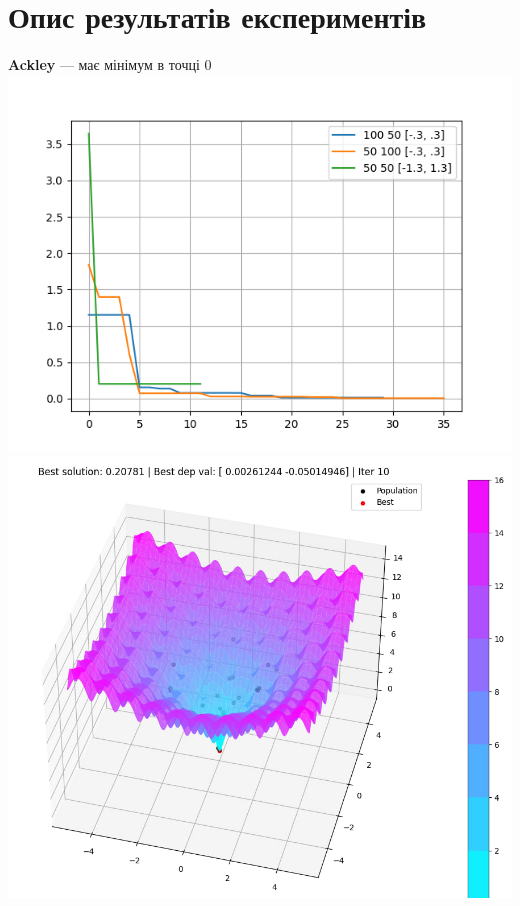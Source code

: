 \documentclass{article}
\begin{document}
    \section{Опис результатів експериментів}
        \textbf{Ackley} --- має мінімум в точці 0
            \newline
            \includegraphics[scale=0.7]{Ackley_dif.png}
            \newline
            \includegraphics[scale=0.7]{Ackley.jpg}
            \newline
            
\end{document}
